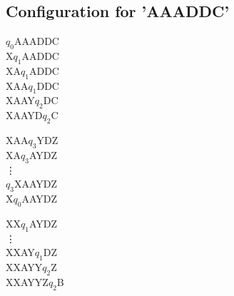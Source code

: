 \documentclass{article}
\begin{document}
	\subsection{Configuration for 'AAADDC'}
	\begin{multicols}{3}
		\begin{minipage}{0.33\textwidth}
			$q_0$AAADDC\\
			X$q_1$AADDC\\
			XA$q_1$ADDC\\
			XAA$q_1$DDC\\
			XAAY$q_2$DC\\
			XAAYD$q_2$C\\
			
		\end{minipage}
		
		\begin{minipage}{0.33\textwidth}
			XAA$q_3$YDZ\\
			XA$q_3$AYDZ\\
			\vdots \\
			$q_3$XAAYDZ\\
			X$q_0$AAYDZ\\
		\end{minipage}
	
		\begin{minipage}{0.33\textwidth}
			XX$q_1$AYDZ\\
			\vdots \\
			XXAY$q_1$DZ\\
			XXAYY$q_2$Z\\
			XXAYYZ$q_2$B\\
		\end{minipage}
	\end{multicols}
\end{document}

